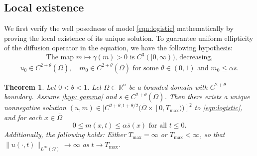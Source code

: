 \documentclass{article}
\newtheorem{theorem}{Theorem}[section]
\begin{document}
\subsection{Local existence}
We first verify the well posedness of model \eqref{eqn:logistic} mathematically by proving the local existence of its unique solution.
To guarantee uniform ellipticity of the diffusion operator in the equation, we have the following hypothesis:
\begin{equation}
\label{hyp: gamma}    
\text{The  map } m\mapsto\gamma(m)>0 \text{ is $C^3([0,\infty))$, decreasing,}
\end{equation}
\begin{equation}
\label{hyp: id}    
\begin{aligned}
u_0\in C^{2+\theta}(\overline{\Omega}),\quad m_0\in C^{2+\theta}(\overline{\Omega}) \text{ for some } \theta\in(0,1) \text{ and } m_0\le \alpha \bar s.
\end{aligned}
\end{equation}
\begin{theorem}Let $0<\theta<1$. Let $\Omega\subset \mathbb{R}^n$ be a bounded domain with $C^{2+\theta}$ boundary. Assume  \eqref{hyp: gamma} and $s\in C^{2+\theta}(\overline{\Omega})$. Then there exists a unique nonnegative solution $(u,m)\in [C^{2+\theta,1+\theta/2}(\overline{\Omega}\times[0,T_{\max}))]^2$ to \eqref{eqn:logistic}, and for each $x\in \bar\Omega$
\[0\le m(x,t)\le \alpha \bar s(x) \text{ for all } t\le 0.\]
 Additionally, the following holds: Either $T_{\max}=\infty$ or $T_{\max}<\infty$, so that $\|u(\cdot,t)\|_{L^\infty(\Omega)}\to \infty $ as $t\to T_{\max}$.
\end{theorem}
\end{document}
